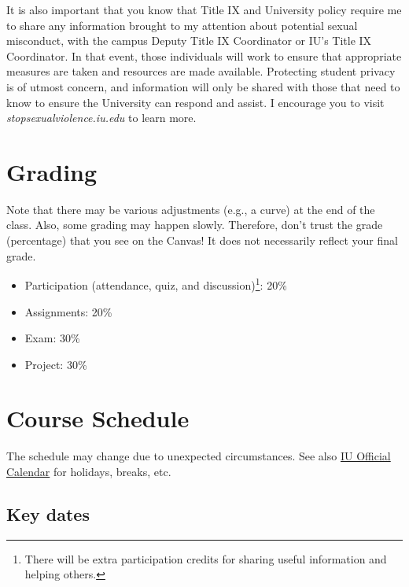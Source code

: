 \documentclass[11pt,article,oneside]{memoir} %
\begin{document}
\begin{enumerate}
\begin{enumerate}
\end{enumerate}

It is also important that you know that Title IX and University policy require
me to share any information brought to my attention about potential sexual
misconduct, with the campus Deputy Title IX Coordinator or IU's Title IX
Coordinator. In that event, those individuals will work to ensure that
appropriate measures are taken and resources are made available. Protecting
student privacy is of utmost concern, and information will only be shared with
those that need to know to ensure the University can respond and assist. I
encourage you to visit \emph{stopsexualviolence.iu.edu} to learn more.


\end{enumerate}
\section{Grading}\label{sec:grading_tentative_} %

Note that there may be various adjustments (e.g., a curve) at the end of the class. Also, some grading may happen slowly. Therefore, don't trust the grade (percentage) that you see on the Canvas! It does not necessarily reflect your final grade.

\vspace{-10pt}
\begin{itemize}\itemsep=0pt

\item Participation (attendance, quiz, and discussion)\footnote{There will be extra participation credits for sharing useful information and helping others.}: 20\% 

\item Assignments: 20\%

\item Exam: 30\%

\item Project: 30\%

\end{itemize}
\clearpage
\section{Course Schedule} %

The schedule may change due to unexpected circumstances. See also \href{https://registrar.indiana.edu/official-calendar/index.shtml}{IU Official Calendar} for holidays, breaks, etc. 

\subsection{Key dates}\label{sub:key_dates} %
\end{document}
